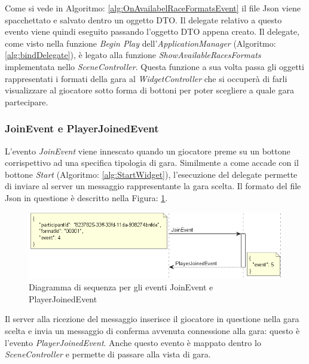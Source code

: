         Come si vede in Algoritmo: \ref{alg:OnAvailabelRaceFormatsEvent} il file Json viene spacchettato e salvato dentro un oggetto DTO.
        Il delegate relativo a questo evento viene quindi eseguito passando l'oggetto DTO appena creato.
        Il delegate, come visto nella funzione \textit{Begin Play} dell'\textit{ApplicationManager} (Algoritmo: \ref{alg:bindDelegate}), è legato alla funzione \textit{ShowAvailableRacesFormats} implementata nello \textit{SceneController}.
        Questa funzione a sua volta passa gli oggetti rappresentati i formati della gara al \textit{WidgetController} che si occuperà di farli visualizzare al giocatore sotto forma di bottoni per poter scegliere a quale gara partecipare.

        \subsubsection{JoinEvent e PlayerJoinedEvent}

        L'evento \textit{JoinEvent} viene innescato quando un giocatore preme su un bottone corrispettivo ad una specifica tipologia di gara.
        Similmente a come accade con il bottone \textit{Start} (Algoritmo: \ref{alg:StartWidget}), l'esecuzione del delegate permette di inviare al server un messaggio rappresentante la gara scelta.
        Il formato del file Json in questione è descritto nella Figura: \ref{img:JoinEvent}.

        \begin{figure}[b]\label{img:JoinEvent}
            \centering
            \includegraphics[width=13cm]{figure/JoinEvent.png}
            \caption{Diagramma di sequenza per gli eventi JoinEvent e PlayerJoinedEvent}
        \end{figure}

        Il server alla ricezione del messaggio inserisce il giocatore in questione nella gara scelta e invia un messaggio di conferma avvenuta connessione alla gara: questo è l'evento \textit{PlayerJoinedEvent}.
        Anche questo evento è mappato dentro lo \textit{SceneController} e permette di passare alla vista di gara.

